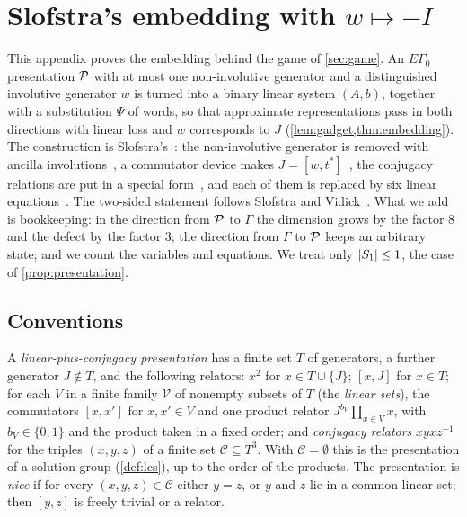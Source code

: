 \section{Slofstra's embedding with \texorpdfstring{$w\mapsto-I$}{w -> -I}}\label{app:gadget}

This appendix proves the embedding behind the game of \cref{sec:game}. An $E\Gamma_0$ presentation $\mathcal P$ with at most one
non-involutive generator and a distinguished involutive generator $w$ is turned into a binary linear system $(A,b)$, together with a
substitution $\Psi$ of words, so that approximate representations pass in both directions with linear loss and $w$ corresponds to $J$
(\cref{lem:gadget,thm:embedding}). The construction is Slofstra's~\cite[\S4]{Slo19}: the non-involutive generator is removed with ancilla
involutions~\cite[Prop.~4.8]{Slo19}, a commutator device makes $J=[w,t^*]$~\cite[Lemma~5.2]{Slo19}, the conjugacy relations are put in a
special form~\cite[Lemma~4.4]{Slo19}, and each of them is replaced by six linear equations~\cite[Prop.~4.2]{Slo19}. The two-sided statement
follows Slofstra and Vidick~\cite[Prop.~6.2]{SV18}. What we add is bookkeeping: in the direction from $\mathcal P$ to $\Gamma$ the dimension
grows by the factor $8$ and the defect by the factor $3$; the direction from $\Gamma$ to $\mathcal P$ keeps an arbitrary state; and we count the
variables and equations. We treat only $\lvert S_1\rvert\le1$, the case of \cref{prop:presentation}.

\subsection{Conventions}\label{gadget:conv}

A \emph{linear-plus-conjugacy presentation} has a finite set $T$ of generators, a further generator $J\notin T$, and the following
relators: $x^2$ for $x\in T\cup\{J\}$; $[x,J]$ for $x\in T$; for each $V$ in a finite family $\mathcal V$ of nonempty subsets of $T$ (the
\emph{linear sets}), the commutators $[x,x']$ for $x,x'\in V$ and one product relator $J^{b_V}\prod_{x\in V}x$, with $b_V\in\{0,1\}$ and the
product taken in a fixed order; and \emph{conjugacy relators} $xyxz^{-1}$ for the triples $(x,y,z)$ of a finite set $\mathcal C\subseteq T^3$.
With $\mathcal C=\emptyset$ this is the presentation of a solution group (\cref{def:lcs}), up to the order of the products. The presentation
is \emph{nice} if for every $(x,y,z)\in\mathcal C$ either $y=z$, or $y$ and $z$ lie in a common linear set; then $[y,z]$ is freely trivial or a
relator.


